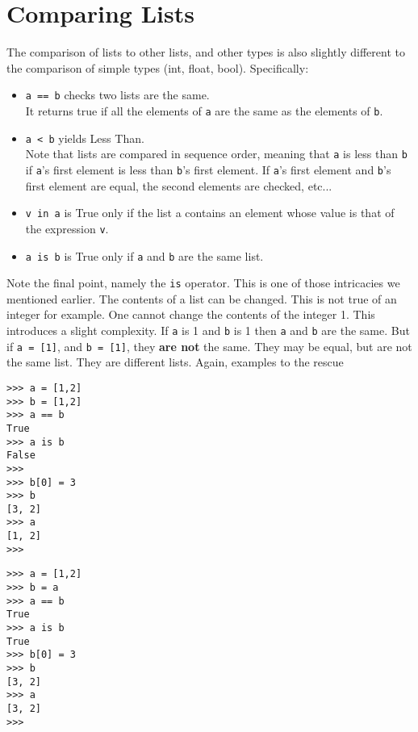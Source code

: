 \section{Comparing Lists}

The comparison of lists to other lists, and other types is also   slightly different to the comparison of simple types (int, float,   bool). Specifically:
\begin{itemize}
	\item 
\texttt{a == b} checks two lists are the same. \\
It returns true if all the elements of \texttt{a} are the same as the elements of \texttt{b}.
	\item 
\texttt{a < b} yields Less Than. \\
Note that lists are    compared in sequence order, meaning that \texttt{a} is less than \texttt{b} if    \texttt{a}'s first element is less than \texttt{b}'s first element. If \texttt{a}'s first    element and \texttt{b}'s first element are equal, the second elements are    checked, etc...
	\item 
\texttt{v in a} is True only if the list a contains an    element whose value is that of the expression \texttt{v}.
	\item 
\texttt{a is b} is True only if \texttt{a} and \texttt{b} are the same    list.
\end{itemize}

Note the final point, namely the \texttt{is} operator. This is one of those   intricacies we mentioned earlier. The contents of a list can be   changed. This is not true of an integer for example. One cannot change   the contents of the integer 1. This introduces a slight complexity. If   \texttt{a} is 1 and \texttt{b} is 1 then \texttt{a} and \texttt{b} are the same. But if 
\texttt{a =   [1]}, and 
\texttt{b = [1]}, they \textbf{are not} the   same. They may be equal, but are not the same list. They are different   lists. Again, examples to the rescue
\begin{lstlisting}
>>> a = [1,2]
>>> b = [1,2]
>>> a == b
True
>>> a is b
False
>>>
>>> b[0] = 3
>>> b
[3, 2]
>>> a
[1, 2]
>>>
\end{lstlisting}
\begin{lstlisting}
>>> a = [1,2]
>>> b = a
>>> a == b
True
>>> a is b
True
>>> b[0] = 3
>>> b
[3, 2]
>>> a
[3, 2]
>>>
\end{lstlisting}

